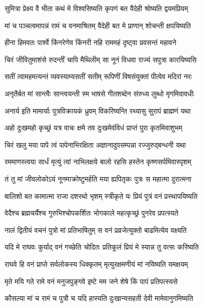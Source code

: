\twolineshloka
{सुमित्रा प्रेक्ष्य वै भीता कथं मे विश्वसिष्यति}
{कृपणं बत वैदेही श्रोष्यति द्वयमप्रियम्} %

\twolineshloka
{मां च पञ्चत्वमापन्नं रामं च वनमाश्रितम्}
{वैदेही बत मे प्राणान् शोचन्ती क्षपयिष्यति} %

\twolineshloka
{हीना हिमवतः पार्श्वे किंनरेणेव किंनरी}
{नहि राममहं दृष्ट्वा प्रवसन्तं महावने} %

\twolineshloka
{चिरं जीवितुमाशंसे रुदन्तीं चापि मैथिलीम्}
{सा नूनं विधवा राज्यं सपुत्रा कारयिष्यसि} %

\twolineshloka
{सतीं त्वामहमत्यन्तं व्यवस्याम्यसतीं सतीम्}
{रूपिणीं विषसंयुक्तां पीत्वेव मदिरां नरः} %

\twolineshloka
{अनृतैर्बत मां सान्त्वैः सान्त्वयन्ती स्म भाषसे}
{गीतशब्देन संरुध्य लुब्धो मृगमिवावधीः} %

\twolineshloka
{अनार्य इति मामार्याः पुत्रविक्रायकं ध्रुवम्}
{विकरिष्यन्ति रथ्यासु सुरापं ब्राह्मणं यथा} %

\twolineshloka
{अहो दुःखमहो कृच्छ्रं यत्र वाचः क्षमे तव}
{दुःखमेवंविधं प्राप्तं पुरा कृतमिवाशुभम्} %

\twolineshloka
{चिरं खलु मया पापे त्वं पापेनाभिरक्षिता}
{अज्ञानादुपसम्पन्ना रज्जुरुद्बन्धनी यथा} %

\twolineshloka
{रममाणस्त्वया सार्धं मृत्युं त्वां नाभिलक्षये}
{बालो रहसि हस्तेन कृष्णसर्पमिवास्पृशम्} %

\twolineshloka
{तं तु मां जीवलोकोऽयं नूनमाक्रोष्टुमर्हति}
{मया ह्यपितृकः पुत्रः स महात्मा दुरात्मना} %

\twolineshloka
{बालिशो बत कामात्मा राजा दशरथो भृशम्}
{स्त्रीकृते यः प्रियं पुत्रं वनं प्रस्थापयिष्यति} %

\twolineshloka
{वेदैश्च ब्रह्मचर्यैश्च गुरुभिश्चोपकर्शितः}
{भोगकाले महत्कृच्छ्रं पुनरेव प्रपत्स्यते} %

\twolineshloka
{नालं द्वितीयं वचनं पुत्रो मां प्रतिभाषितुम्}
{स वनं प्रव्रजेत्युक्तो बाढमित्येव वक्ष्यति} %

\twolineshloka
{यदि मे राघवः कुर्याद् वनं गच्छेति चोदितः}
{प्रतिकूलं प्रियं मे स्यान्न तु वत्सः करिष्यति} %

\twolineshloka
{राघवे हि वनं प्राप्ते सर्वलोकस्य धिक्कृतम्}
{मृत्युरक्षमणीयं मां नयिष्यति यमक्षयम्} %

\twolineshloka
{मृते मयि गते रामे वनं मनुजपुङ्गवे}
{इष्टे मम जने शेषे किं पापं प्रतिपत्स्यसे} %

\twolineshloka
{कौसल्या मां च रामं च पुत्रौ च यदि हास्यति}
{दुःखान्यसहती देवी मामेवानुगमिष्यति} %

